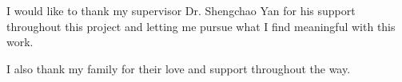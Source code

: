 \section*{}\label{sec:acknowledgements}


I would like to thank my supervisor Dr. Shengchao Yan for his support throughout this project and letting me pursue what I find meaningful with this work.

I also thank my family for their love and support throughout the way.


